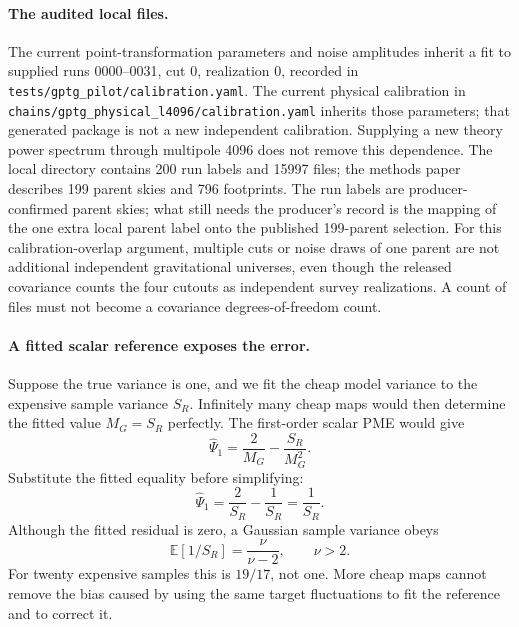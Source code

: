 \documentclass[11pt]{article}
\newcommand{\E}{\mathbb{E}}
\begin{document}
\paragraph{The audited local files.}
The current point-transformation parameters and noise amplitudes inherit a
fit to supplied runs 0000--0031, cut 0, realization 0, recorded in
\nolinkurl{tests/gptg_pilot/calibration.yaml}. The current physical calibration
in \nolinkurl{chains/gptg_physical_l4096/calibration.yaml} inherits those
parameters; that generated package is not a new independent calibration. Supplying a new
theory power spectrum through multipole 4096 does not remove this
dependence. The local directory contains 200 run labels and 15997 files;
the methods paper~\cite{gomes} describes 199 parent skies and 796 footprints. The
run labels are producer-confirmed parent skies; what still needs the
producer's record is the mapping of the one extra local parent label onto
the published 199-parent selection. For this calibration-overlap argument,
multiple cuts or noise draws of one parent are not additional independent
gravitational universes, even though the released covariance counts the
four cutouts as independent survey realizations. A count of files must not
become a covariance degrees-of-freedom count.

\paragraph{A fitted scalar reference exposes the error.}
Suppose the true variance is one, and we fit the cheap model variance to
the expensive sample variance $S_R$. Infinitely many cheap maps would then
determine the fitted value $M_G=S_R$ perfectly. The first-order scalar PME
would give
\begin{equation}
 \widehat\Psi_1=\frac{2}{M_G}-\frac{S_R}{M_G^2}.
\end{equation}
Substitute the fitted equality before simplifying:
\begin{equation}
 \widehat\Psi_1=\frac{2}{S_R}-\frac{1}{S_R}=\frac{1}{S_R}.
\end{equation}
Although the fitted residual is zero, a Gaussian sample variance obeys
\begin{equation}
 \E[1/S_R]=\frac{\nu}{\nu-2},\qquad \nu>2.
\end{equation}
For twenty expensive samples this is $19/17$, not one. More cheap maps
cannot remove the bias caused by using the same target fluctuations to
fit the reference and to correct it.
\end{document}
